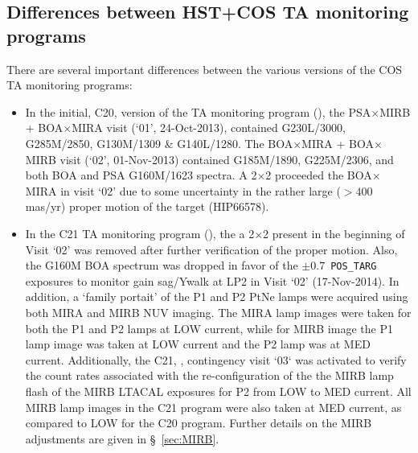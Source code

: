\subsection{Differences between HST+COS TA monitoring programs}\label{subsec:differences}

There are several important differences between the various versions of the COS TA monitoring programs:

\begin{itemize}
\item{
In the initial, C20, version of the TA monitoring program (),
the PSA$\times$MIRB + BOA$\times$MIRA  visit (`01', 24-Oct-2013), contained G230L/3000, G285M/2850, G130M/1309 \& G140L/1280.
The BOA$\times$MIRA + BOA$\times$MIRB  visit (`02', 01-Nov-2013) contained G185M/1890, G225M/2306, and both BOA and PSA G160M/1623 spectra.
A 2$\times$2  proceeded the BOA$\times$MIRA  in visit `02' due to some uncertainty in the rather large ($> 400$ mas/yr) proper motion of the target (HIP66578).
}
\item{
In the C21 TA monitoring program (), the a 2$\times$2  present in the beginning of Visit `02' was removed after further verification of the proper motion.
Also, the G160M BOA spectrum was dropped in favor of the $\pm 0.7$\arcsec~\texttt{POS\_TARG} exposures to monitor gain sag/Ywalk at LP2 in Visit `02' (17-Nov-2014).
In addition, a `family portait' of the P1 and P2 PtNe lamps were acquired using both MIRA and MIRB NUV imaging.
The MIRA lamp images were taken for both the P1 and P2 lamps at LOW current, while for MIRB image the P1 lamp image was taken at LOW current and the P2 lamp was at MED current.
Additionally, the C21, , contingency visit `03` was activated to verify the count rates associated with the re-configuration of the
the MIRB  lamp flash of the MIRB \textsc{LTACAL} exposures for P2 from LOW to MED current.
All MIRB lamp images in the C21 program were also taken at MED current, as  compared to LOW for the C20 program.
Further details on the MIRB  adjustments are given in \S~\ref{sec:MIRB}.\\

}
\end{itemize}
